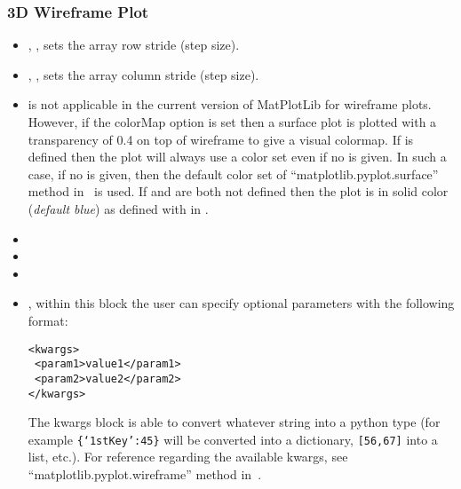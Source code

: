 \subsubsection{3D Wireframe Plot}
\begin{itemize}
  \item {}, , sets the array row
  stride (step size).
  \item {}, , sets the array
  column stride (step size).
  \item {}
  \nb {} is not applicable in the current version of MatPlotLib  for wireframe plots. 
  However, if the colorMap option is set then a surface plot is plotted with a transparency of 0.4 on top of wireframe to give a visual colormap.
  \nb If  is defined then the plot will always use a color set even if no  is given. 
  In such a case, if no  is given, then the default color set of  ``matplotlib.pyplot.surface'' method in~\cite{MatPlotLib} is used.
  If  and  are both not defined then the plot is in solid color (\textit{default blue}) as defined with  in   .
  \item {}
  \item {}
  \item {}
  \item {}, within this block the user can specify optional
  parameters with the following format:

\begin{lstlisting}[style=XML]
<kwargs>
 <param1>value1</param1>
 <param2>value2</param2>
</kwargs>
\end{lstlisting}

  The kwargs block is able to convert whatever string into a python type (for
  example  \texttt{\{`1stKey':45\}} will
  be converted into a dictionary, 
   \texttt{[56,67]}  into a list, etc.).
  For reference regarding the available kwargs, see
  ``matplotlib.pyplot.wireframe'' method in~\cite{MatPlotLib}.
\end{itemize}

